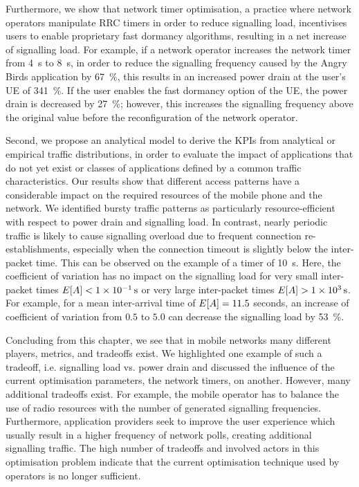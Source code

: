Furthermore, we show that network timer optimisation, a practice where network operators manipulate \gls{RRC} timers in order to reduce signalling load, incentivises users to enable proprietary fast dormancy algorithms, resulting in a net increase of signalling load.
For example, if a network operator increases the \TDCH network timer from \SI{4}{\second} to \SI{8}{\second}, in order to reduce the signalling frequency caused by the Angry Birds application by \SI{67}{\percent}, this results in an increased power drain at the user's \gls{UE} of \SI{341}{\percent}.
If the user enables the fast dormancy option of the \gls{UE}, the power drain is decreased by \SI{27}{\percent}; however, this increases the signalling frequency above the original value before the reconfiguration of the network operator.

Second, we propose an analytical model to derive the \glspl{KPI} from analytical or empirical traffic distributions, in order to evaluate the impact of applications that do not yet exist or classes of applications defined by a common traffic characteristics.
Our results show that different access patterns have a considerable impact on the required resources of the mobile phone and the network.
We identified bursty traffic patterns as particularly resource-efficient with respect to power drain and signalling load.
In contrast, nearly periodic traffic is likely to cause signalling overload due to frequent connection re-establishments, especially when the connection timeout is slightly below the inter-packet time.
This can be observed on the example of a \TDCH timer of \SI{10}{\second}.
Here, the coefficient of variation has no impact on the signalling load for very small inter-packet times \(E[A]<\SI{1e-1}{\second}\) or very large inter-packet times \(E[A]>\SI{1e3}{\second}\).
For example, for a mean inter-arrival time of \(E[A] = 11.5\) seconds, an increase of coefficient of variation from \(0.5\) to \(5.0\) can decrease the signalling load by \SI{53}{\percent}.

Concluding from this chapter, we see that in mobile networks many different players, metrics, and tradeoffs exist.
We highlighted one example of such a tradeoff, i.e. signalling load vs. power drain and discussed the influence of the current optimisation parameters, the network timers, on another.
However, many additional tradeoffs exist.
For example, the mobile operator has to balance the use of radio resources with the number of generated signalling frequencies.
Furthermore, application providers seek to improve the user experience which usually result in a higher frequency of network polls, creating additional signalling traffic.
The high number of tradeoffs and involved actors in this optimisation problem indicate that the current optimisation technique used by operators is no longer sufficient.

